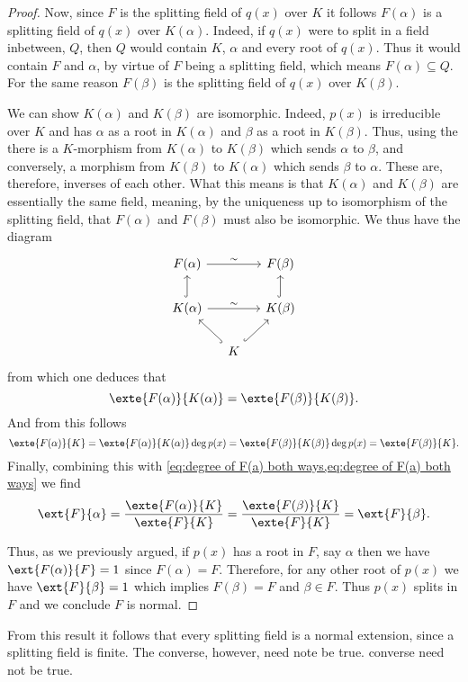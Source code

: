 \documentclass[12pt,oneside]{book}
\begin{document}
\begin{proof}
	Now, since \( F \) is the splitting field of \( q(x) \) over \( K \) it follows \(
	F(\alpha) \) is a splitting field of \( q(x) \) over \( K(\alpha) \). Indeed, if \(
	q(x) \) were to split in a field inbetween, \( Q \), then \( Q \) would contain \(
	K \), \( \alpha \) and every root of \( q(x) \). Thus it would contain \( F \) and \(
	\alpha \), by virtue of \( F \) being a splitting field, which means \( F(\alpha)
	\subseteq Q \). For the same reason \( F(\beta) \) is the splitting field of \( q(x) \)
	over \( K(\beta) \). 
	
	We can show \( K(\alpha) \) and \( K(\beta) \) are isomorphic. Indeed, \(
	p(x) \) is irreducible over \( K \) and has \( \alpha \) as a root in \( K(\alpha) \)
	and \( \beta \) as a root in \( K(\beta) \). Thus, using the  there is a \( K \)-morphism from \( K(\alpha) \) to \( K(\beta) \) which
	sends \( \alpha \) to \( \beta \), and conversely, a morphism from \( K(\beta) \) to \(
	K(\alpha)\) which sends \( \beta \) to \( \alpha \). These are, therefore, inverses of
	each other. What this means is that \( K(\alpha) \) and \( K(\beta) \) are essentially
	the same field, meaning, by the uniqueness up to isomorphism of the splitting field,
	that \( F(\alpha) \) and \( F(\beta) \) must also be isomorphic. We thus have the
	diagram
	\begin{equation*}
		\begin{tikzcd}[column sep = small]
			F(\alpha) \arrow[rr, "\sim"] & & F(\beta) \\
			K(\alpha) \arrow[rr, "\sim"] \arrow[u, hook] & &  K(\beta) \arrow[u, hook] \\
																									 & K \arrow[lu, hook] \arrow[ru, hook] &
		\end{tikzcd}
	\end{equation*}
	from which one deduces that
	\begin{equation*}
		\exte{F(\alpha)}{K(\alpha)} = \exte{F(\beta)}{K(\beta)}.
	\end{equation*}
	And from this follows
	\begin{equation*}
		\exte{F(\alpha)}{K} = \exte{F(\alpha)}{K(\alpha)} \deg{p(x)} =
		\exte{F(\beta)}{K(\beta)} \deg{p(x)} = \exte{F(\beta)}{K}.
	\end{equation*}
	Finally, combining this with \cref{eq:degree of F(a) both ways,eq:degree of F(a) both
	ways} we find
	\begin{equation*}
		\ext{F}{\alpha} = \frac{\exte{F(\alpha)}{K}}{\exte{F}{K}} =
		\frac{\exte{F(\beta)}{K}}{\exte{F}{K}} = \ext{F}{\beta}.
	\end{equation*}
	
	Thus, as we previously argued, if \( p(x) \) has a root in \( F \), say \( \alpha \)
	then we have \( \ext{F(\alpha)}{F} = 1 \) since \( F(\alpha) = F \). Therefore, for any
	other root of \( p(x) \) we have \( \ext{F}{\beta} = 1 \) which implies \( F(\beta) = F
	\) and \( \beta \in F \). Thus \( p(x) \) splits in \( F \) and we conclude \( F \) is
	normal.
\end{proof}
From this result it follows that every splitting field is a normal extension, since a
splitting field is finite. The converse, however, need note be true.
converse need not be true.
\end{document}
